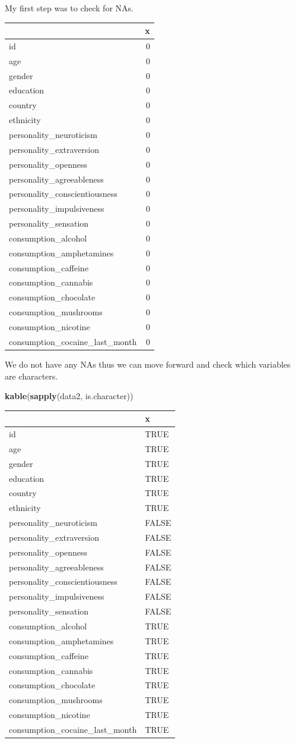 \documentclass[
]{article}
\newenvironment{Shaded}{\begin{snugshade}}{\end{snugshade}}
\newcommand{\KeywordTok}[1]{\textcolor[rgb]{0.13,0.29,0.53}{\textbf{#1}}}
\newcommand{\NormalTok}[1]{#1}
\newcommand{\OperatorTok}[1]{\textcolor[rgb]{0.81,0.36,0.00}{\textbf{#1}}}
\newcommand{\StringTok}[1]{\textcolor[rgb]{0.31,0.60,0.02}{#1}}
\begin{document}
My first step was to check for NAs.

\begin{Shaded}
\end{Shaded}

\begin{longtable}[]{@{}lr@{}}
\toprule
& x\tabularnewline
\midrule
\endhead
id & 0\tabularnewline
age & 0\tabularnewline
gender & 0\tabularnewline
education & 0\tabularnewline
country & 0\tabularnewline
ethnicity & 0\tabularnewline
personality\_neuroticism & 0\tabularnewline
personality\_extraversion & 0\tabularnewline
personality\_openness & 0\tabularnewline
personality\_agreeableness & 0\tabularnewline
personality\_conscientiousness & 0\tabularnewline
personality\_impulsiveness & 0\tabularnewline
personality\_sensation & 0\tabularnewline
consumption\_alcohol & 0\tabularnewline
consumption\_amphetamines & 0\tabularnewline
consumption\_caffeine & 0\tabularnewline
consumption\_cannabis & 0\tabularnewline
consumption\_chocolate & 0\tabularnewline
consumption\_mushrooms & 0\tabularnewline
consumption\_nicotine & 0\tabularnewline
consumption\_cocaine\_last\_month & 0\tabularnewline
\bottomrule
\end{longtable}

We do not have any NAs thus we can move forward and check which
variables are characters.

\begin{Shaded}
\begin{Highlighting}[]
\KeywordTok{kable}\NormalTok{(}\KeywordTok{sapply}\NormalTok{(data2, is.character))}
\end{Highlighting}
\end{Shaded}

\begin{longtable}[]{@{}ll@{}}
\toprule
& x\tabularnewline
\midrule
\endhead
id & TRUE\tabularnewline
age & TRUE\tabularnewline
gender & TRUE\tabularnewline
education & TRUE\tabularnewline
country & TRUE\tabularnewline
ethnicity & TRUE\tabularnewline
personality\_neuroticism & FALSE\tabularnewline
personality\_extraversion & FALSE\tabularnewline
personality\_openness & FALSE\tabularnewline
personality\_agreeableness & FALSE\tabularnewline
personality\_conscientiousness & FALSE\tabularnewline
personality\_impulsiveness & FALSE\tabularnewline
personality\_sensation & FALSE\tabularnewline
consumption\_alcohol & TRUE\tabularnewline
consumption\_amphetamines & TRUE\tabularnewline
consumption\_caffeine & TRUE\tabularnewline
consumption\_cannabis & TRUE\tabularnewline
consumption\_chocolate & TRUE\tabularnewline
consumption\_mushrooms & TRUE\tabularnewline
consumption\_nicotine & TRUE\tabularnewline
consumption\_cocaine\_last\_month & TRUE\tabularnewline
\bottomrule
\end{longtable}
\end{document}
